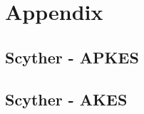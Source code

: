 \chapter{Appendix}
\label{app:listings}


\section{Scyther - APKES}
\label{app:apkes}



\section{Scyther - AKES}
\label{app:akes}

